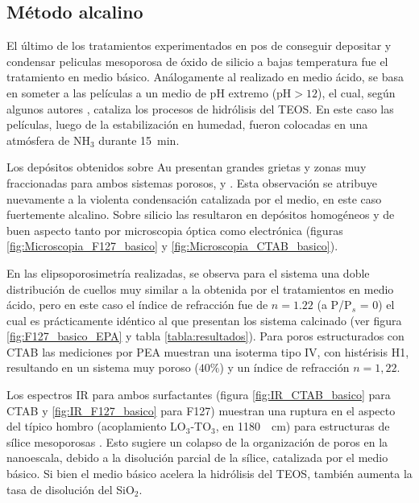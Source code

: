 	 \subsection{Método alcalino}

	 	 El último de los tratamientos experimentados en pos de conseguir depositar y condensar peliculas mesoporosa de óxido de silicio a bajas temperatura fue el tratamiento en medio básico. Análogamente al realizado en medio ácido, se basa en someter a las películas a un medio de pH extremo (pH$>12$), el cual, según algunos autores \cite{Soler-Illia2011,Huo1996,Ichinose2002,GonzalezSolveyra2017}, cataliza los procesos de hidrólisis del TEOS. En este caso las películas, luego de la estabilización en humedad, fueron colocadas en una atmósfera de NH$_3$ durante \SI{15}{\minute}. 

		 Los depósitos obtenidos sobre Au presentan grandes grietas y zonas muy fraccionadas para ambos sistemas porosos, \pdmF\space y \pdmC. Esta observación se atribuye nuevamente a la violenta condensación catalizada por el medio, en este caso fuertemente alcalino. Sobre silicio las \pdm\space resultaron en depósitos homogéneos y de buen aspecto tanto por microscopia óptica como electrónica (figuras \ref{fig:Microscopia_F127_basico} y \ref{fig:Microscopia_CTAB_basico}).

		 En las elipsoporosimetría realizadas, se observa para el sistema \pdmF\space una doble distribución de cuellos muy similar a la obtenida por el tratamientos en medio ácido, pero en este caso el índice de refracción fue de $n=1.22$ (a P/P$_s$ = 0) el cual es prácticamente idéntico al que presentan los sistema calcinado (ver figura \ref{fig:F127_basico_EPA} y tabla \ref{tabla:resultados}). Para poros estructurados con CTAB las mediciones por PEA muestran una isoterma tipo IV, con histérisis H1, resultando en un sistema muy poroso ($40\%$) y un índice de refracción $n=1,22$.
	
		 Los espectros IR para ambos surfactantes (figura \ref{fig:IR_CTAB_basico} para CTAB y \ref{fig:IR_F127_basico} para F127) muestran una ruptura en el aspecto del típico hombro (acoplamiento LO$_3$-TO$_3$, en \SI{1180}{\per\cm}) para estructuras de sílice mesoporosas \cite{Olsen1989,Innocenzi2003,Angelome2008}. Esto sugiere un colapso de la organización de poros en la nanoescala, debido a la disolución parcial de la sílice, catalizada por el medio básico. Si bien el medio básico acelera la hidrólisis del TEOS, también aumenta la tasa de disolución del SiO$_2$.\cite{Mazer1994,Niibori2000,Gorrepati2010}


